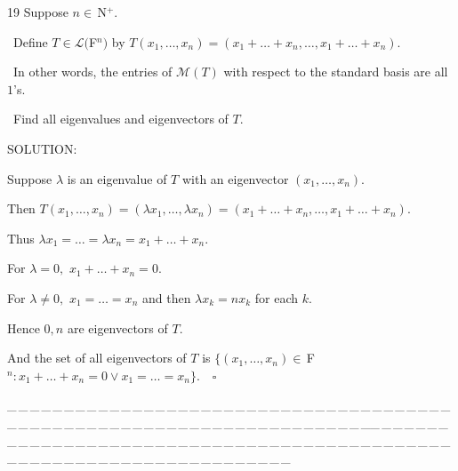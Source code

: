 \documentclass[a4paper, 11pt, UTF8]{article}
\def\Lm{\mathcal{L}}
\def\Mt{\mathcal{M}}
\def\Fbfc{$\,{\timesbf F}$}
\def\Nbp{$\,{\timesbf N}$^+}
\begin{document}
\begin{large}
{\timesbf\Large 19} {\timessl\Large 
Suppose $n\in\Nbp$.}\par\quad\,
{\timessl\Large Define $T\in\Lm(${\timesbf F}$^{n})$ by $T(x_1,\dots,x_n)=(x_1+\dots+x_n,\dots,x_1+\dots+x_n).$}\par\quad\,
{\timessl\Large In other words, the entries of $\Mt(T)$ with respect to the standard basis are all \,$1$'s.}\par\quad\,
{\timessl\Large Find all eigenvalues and eigenvectors of $T.$}\par
{\timesbf S\footnotesize{OLUTION:}}\par\quad
Suppose $\lambda$ is an eigenvalue of $T$ with an eigenvector $(x_1,\dots,x_n).$\par\quad
Then $T(x_1,\dots,x_n)=(\lambda x_1,\dots,\lambda x_n)=(x_1+\dots+x_n,\dots,x_1+\dots+x_n).$\par\quad
Thus $\lambda x_1=\dots=\lambda x_n=x_1+\dots+x_n.$\par\quad
For $\lambda=0,$ $x_1+\dots+x_n=0.$\par\quad
For $\lambda\neq 0,$ $x_1=\dots=x_n$ and then $\lambda x_k=n x_k$ for each $k.$\par\quad
Hence $0,n$ are eigenvectors of $T.$\par\quad
And the set of all eigenvectors of $T$ is $\{(x_1,\dots,x_n)\in\Fbfc^n:x_1+\dots+x_n=0\vee x_1=\dots=x_n\}.\quad\square$\par
{\tiny \_\,\_\,\_\,\_\,\_\,\_\,\_\,\_\,\_\,\_\,\_\,\_\,\_\,\_\,\_\,\_\,\_\,\_\,\_\,\_\,\_\,\_\,\_\,\_\,\_\,\_\,\_\,\_\,\_\,\_\,\_\,\_\,\_\,\_\,\_\,\_\,\_\,\_\,\_\,\_\,\_\,\_\,\_\,\_\,\_\,\_\,\_\,\_\,\_\,\_\,\_\,\_\,\_\,\_\,\_\,\_\,\_\,\_\,\_\,\_\,\_\,\_\,\_\,\_\,\_\,\_\,\_\,\_\,\_\,\_\,\_\_\,\_\,\_\,\_\,\_\,\_\,\_\,\_\,\_\,\_\,\_\,\_\,\_\,\_\,\_\,\_\,\_\,\_\,\_\,\_\,\_\,\_\,\_\,\_\,\_\,\_\,\_\,\_\,\_\,\_\,\_\,\_\,\_\,\_\,\_\,\_\,\_\,\_\,\_\,\_\,\_\,\_\,\_\,\_\,\_\,\_\,\_\,\_\,\_\,\_\,\_\,\_\,\_\,\_\,\_\,\_\,\_\,\_\,\_\,\_\,\_\,\_\,\_\,\_\,\_\,\_\,\_\,\_\,\_\,\_\,\_}\par


\end{large}
\end{document}
